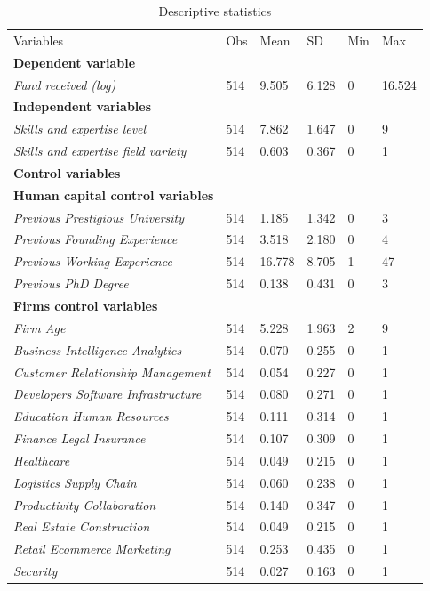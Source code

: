 \documentclass[12pt]{article}
\begin{document}
\begin{table} [ht]
\scriptsize
\renewcommand{\arraystretch}{1.5}
\begin{tabularx}{\textwidth}{ p{4.9cm} p{1.6cm} p{1.6cm} p{1.6cm} p{1.6cm} p{1.6cm} }
\toprule
\multicolumn{1}{l}{Variables}&\multicolumn{1}{l}{Obs}&\multicolumn{1}{l}{Mean}&\multicolumn{1}{l}{SD}&\multicolumn{1}{l}{Min}&\multicolumn{1}{l}{Max} \\
\cmidrule(r){1-6}
\textbf{Dependent variable} & & & & & \\
\textit{Fund received (log)} & 514 & 9.505 & 6.128 & 0 & 16.524 \\
\cmidrule(r){1-6}
\textbf{Independent variables} & & & & & \\
\textit{Skills and expertise level} & 514 & 7.862 & 1.647 & 0 & 9 \\
\textit{Skills and expertise field variety} & 514 & 0.603 & 0.367 & 0 & 1 \\
\cmidrule(r){1-6}\textbf{Control variables} & & & & & \\
\textbf{Human capital control variables} & & & & & \\
\textit{Previous Prestigious University} & 514 & 1.185 & 1.342 & 0 & 3 \\
\textit{Previous Founding Experience} & 514 & 3.518 & 2.180 & 0 & 4 \\
\textit{Previous Working Experience} & 514 & 16.778 & 8.705 & 1 & 47 \\
\textit{Previous PhD Degree} & 514 & 0.138 & 0.431 & 0 & 3 \\
\cmidrule(r){1-6}
\textbf{Firms control variables} & & & & & \\
\textit{Firm Age} & 514 & 5.228 & 1.963 & 2 & 9 \\
\textit{Business Intelligence Analytics} & 514 & 0.070 & 0.255 & 0 & 1 \\
\textit{Customer Relationship Management} & 514 & 0.054 & 0.227 & 0 & 1 \\
\textit{Developers Software Infrastructure} & 514 & 0.080 & 0.271 & 0 & 1 \\
\textit{Education Human Resources} & 514 & 0.111 & 0.314 & 0 & 1 \\
\textit{Finance Legal Insurance} & 514 & 0.107 & 0.309 & 0 & 1 \\
\textit{Healthcare} & 514 & 0.049 & 0.215 & 0 & 1 \\
\textit{Logistics Supply Chain} & 514 & 0.060 & 0.238 & 0 & 1 \\
\textit{Productivity Collaboration} & 514 & 0.140 & 0.347 & 0 & 1 \\
\textit{Real Estate Construction} & 514 & 0.049 & 0.215 & 0 & 1 \\
\textit{Retail Ecommerce Marketing} & 514 & 0.253 & 0.435 & 0 & 1 \\
\textit{Security} & 514 & 0.027 & 0.163 & 0 & 1 \\
\end{tabularx}
\caption{Descriptive statistics}
\label{table4}
\end{table}
\end{document}
